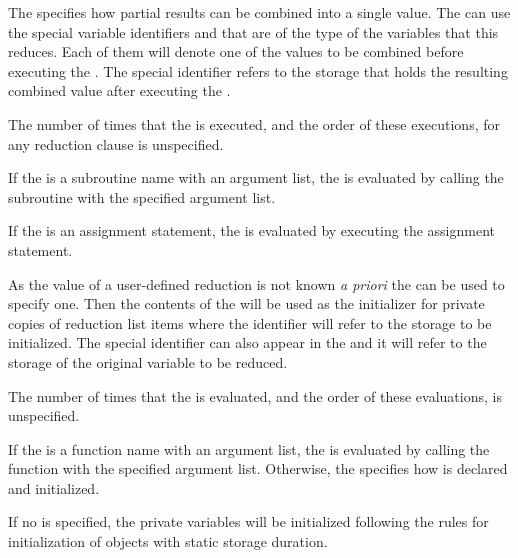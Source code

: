 The  specifies how partial results can be combined into a single 
value. The  can use the special variable identifiers  
and  that are of the type of the variables that this 
 reduces. Each of them will denote one of the values to 
be combined before executing the . The special  
identifier refers to the storage that holds the resulting combined value after 
executing the .

The number of times that the  is executed, and the order of these 
executions, for any reduction clause is unspecified.

\begin{fortranspecific}
If the  is a subroutine name with an argument list, the 
 is evaluated by calling the subroutine with the specified argument list.

If the  is an assignment statement, the  is 
evaluated by executing the assignment statement.
\end{fortranspecific}

As the  value of a user-defined reduction is not known 
\emph{a priori} the  can be used to specify one. Then 
the contents of the  will be used as the initializer 
for private copies of reduction list items where the  identifier 
will refer to the storage to be initialized. The special identifier 
 can also appear in the  and it will 
refer to the storage of the  original variable to be reduced.

The number of times that the  is evaluated, and the order 
of these evaluations, is unspecified.

\begin{ccppspecific}
If the  is a function name with an argument list, the 
 is evaluated by calling the function with the specified 
argument list. Otherwise, the  specifies how  
is declared and initialized.
\end{ccppspecific}

\begin{cspecific}
If no  is specified, the private variables will be initialized
following the rules for initialization of objects with static storage duration.
\end{cspecific}


